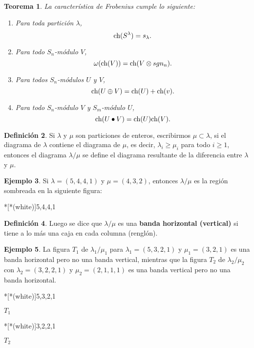 \documentclass[12pt]{book}
\newtheorem{theorem}{Teorema}[section]
\theoremstyle{definition}
\newtheorem{definition}[theorem]{Definición}
\newtheorem{example}[theorem]{Ejemplo}
\newcounter{in}
\newcounter{ini}
\begin{document}
\begin{theorem}
  \label{ch_f_pr}
  La característica de Frobenius cumple lo siguiente:
  \begin{enumerate}
  \item Para toda partición $\lambda$,
    $$\textup{ch}(S^{\lambda}) = s_{\lambda}.$$
  \item Para todo $S_n$-módulo $V$,
    $$ \omega(\textup{ch}(V)) = \textup{ch}(V \otimes sgn_n).$$
  \item Para todos $S_n$-módulos $U$ y $V$,
    $$\textup{ch}(U \oplus V) = \textup{ch}(U) + \textup{ch}(v).$$
  \item Para todo $S_n$-módulo $V$ y $S_m$-módulo $U$,
    $$\textup{ch}(U \bullet V) = \textup{ch}(U)\textup{ch}(V).$$
  \end{enumerate}
\end{theorem}
\begin{definition}
Si $\lambda$ y $\mu$ son particiones de enteros, escribirmos $\mu \subset \lambda$, si el diagrama de $\lambda$ contiene el diagrama de $\mu$, es decir, $\lambda_{i} \geq \mu_{i}$ para todo $i \geq 1$, entonces el diagrama $\lambda / \mu$ se define el diagrama resultante de la diferencia entre $\lambda$ y $\mu$. 
\end{definition}
\begin{example}
Si $\lambda = (5,4,4,1)$ y $\mu = (4,3,2)$, entonces $\lambda / \mu$ es la región sombreada en la siguiente figura:
\begin{center}%
*[*(white)]{5,4,4,1} 
\end{center}
\end{example}
\begin{definition}
Luego se dice que $\lambda / \mu$ es una \textbf{banda horizontal (vertical)} si tiene a lo más una caja en cada columna (renglón). 
\end{definition}
\begin{example}
La figura $T_{1}$ de $\lambda_{1} / \mu_{1}$ para $\lambda_{1} = (5,3,2,1)$ y $\mu_{1} = (3,2,1)$ es una banda horizontal pero no una banda vertical, mientras que la figura $T_{2}$ de $\lambda_{2} / \mu_{2}$ con $\lambda_{2} = (3,2,2,1)$ y $\mu_{2} = (2,1,1,1)$ es una banda vertical pero no una banda horizontal.
\begin{center}
  \begin{minipage}[h]{0.2\linewidth}
    \centering {}*[*(white)]{5,3,2,1} \medskip

   $T_{1}$ 
  \end{minipage}
  \begin{minipage}[h]{0.15\linewidth}
    \centering {}*[*(white)]{3,2,2,1} \smallskip

    $T_{2}$
  \end{minipage}
\end{center}
\end{example}
\end{document}
